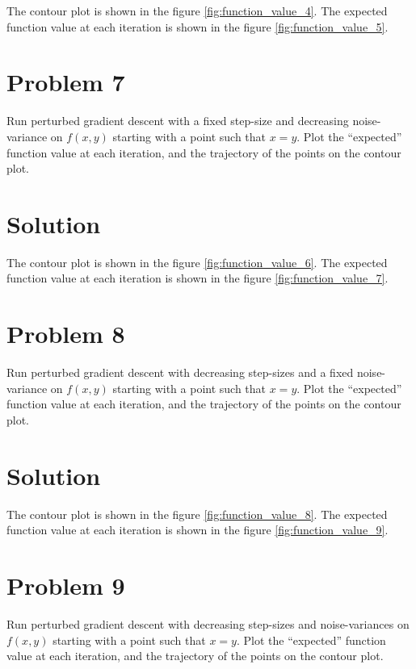 \documentclass{article}
\begin{document}
The contour plot is shown in the figure \ref{fig:function_value_4}. The expected function value at each iteration is shown in the figure \ref{fig:function_value_5}.

\section*{Problem 7}

Run perturbed gradient descent with a fixed step-size and decreasing noise-variance on $f(x, y)$ starting with a point such that $x = y$. Plot the \enquote{expected} function value at each iteration, and the trajectory of the points on the contour plot.

\section*{Solution}

The contour plot is shown in the figure \ref{fig:function_value_6}. The expected function value at each iteration is shown in the figure \ref{fig:function_value_7}.

\section*{Problem 8}

Run perturbed gradient descent with decreasing step-sizes and a fixed noise-variance on $f(x, y)$ starting with a point such that $x = y$. Plot the \enquote{expected} function value at each iteration, and the trajectory of the points on the contour plot.

\section*{Solution}

The contour plot is shown in the figure \ref{fig:function_value_8}. The expected function value at each iteration is shown in the figure \ref{fig:function_value_9}.

\section*{Problem 9}

Run perturbed gradient descent with decreasing step-sizes and noise-variances on $f(x, y)$ starting with a point such that $x = y$. Plot the \enquote{expected} function value at each iteration, and the trajectory of the points on the contour plot.
\end{document}
